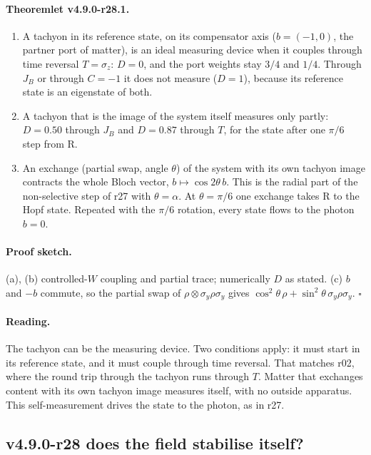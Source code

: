 \paragraph{Theoremlet v4.9.0-r28.1.}
\begin{enumerate}[leftmargin=2em]
\item[(a)] A tachyon in its reference state, on its compensator axis (\(b=(-1,0)\), the partner port of matter), is an ideal measuring
device when it couples through time reversal \(T=\sigma_z\): \(D=0\), and the port weights stay \(3/4\) and \(1/4\).  Through \(J_B\) or
through \(C=-1\) it does not measure (\(D=1\)), because its reference state is an eigenstate of both.
\item[(b)] A tachyon that is the image of the system itself measures only partly: \(D=0.50\) through \(J_B\) and \(D=0.87\) through \(T\),
for the state after one \(\pi/6\) step from R.
\item[(c)] An exchange (partial swap, angle \(\theta\)) of the system with its own tachyon image contracts the whole Bloch vector,
\(b\mapsto\cos2\theta\,b\).  This is the radial part of the non-selective step of r27 with \(\theta=\alpha\).  At \(\theta=\pi/6\) one exchange
takes R to the Hopf state.  Repeated with the \(\pi/6\) rotation, every state flows to the photon \(b=0\).
\end{enumerate}

\paragraph{Proof sketch.}
(a), (b) controlled-\(W\) coupling and partial trace; numerically \(D\) as stated.  (c) \(b\) and \(-b\) commute, so the partial swap of
\(\rho\otimes\sigma_y\rho\sigma_y\) gives \(\cos^2\theta\,\rho+\sin^2\theta\,\sigma_y\rho\sigma_y\).  \(\square\)

\paragraph{Reading.}
The tachyon can be the measuring device.  Two conditions apply: it must start in its reference state, and it must couple through
time reversal.  That matches r02, where the round trip through the tachyon runs through \(T\).  Matter that exchanges content with
its own tachyon image measures itself, with no outside apparatus.  This self-measurement drives the state to the photon, as in r27.

\subsection*{v4.9.0-r28 does the field stabilise itself?}
\label{subsec:v490-r28-self-stabilisation}

